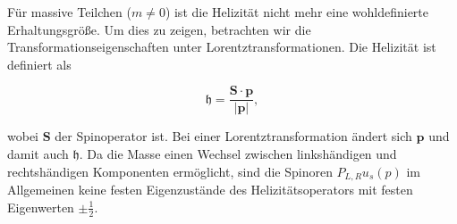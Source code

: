 Für massive Teilchen (\(m \neq 0\)) ist die Helizität nicht mehr eine wohldefinierte Erhaltungsgröße. Um dies zu zeigen, betrachten wir die Transformationseigenschaften unter Lorentztransformationen. Die Helizität ist definiert als

\[
\mathfrak{h} = \frac{\mathbf{S} \cdot \mathbf{p}}{|\mathbf{p}|},
\]

wobei \(\mathbf{S}\) der Spinoperator ist. Bei einer Lorentztransformation ändert sich \(\mathbf{p}\) und damit auch \(\mathfrak{h}\). Da die Masse einen Wechsel zwischen linkshändigen und rechtshändigen Komponenten ermöglicht, sind die Spinoren \(P_{L, R} u_s(p)\) im Allgemeinen keine festen Eigenzustände des Helizitätsoperators mit festen Eigenwerten \(\pm \frac{1}{2}\).

